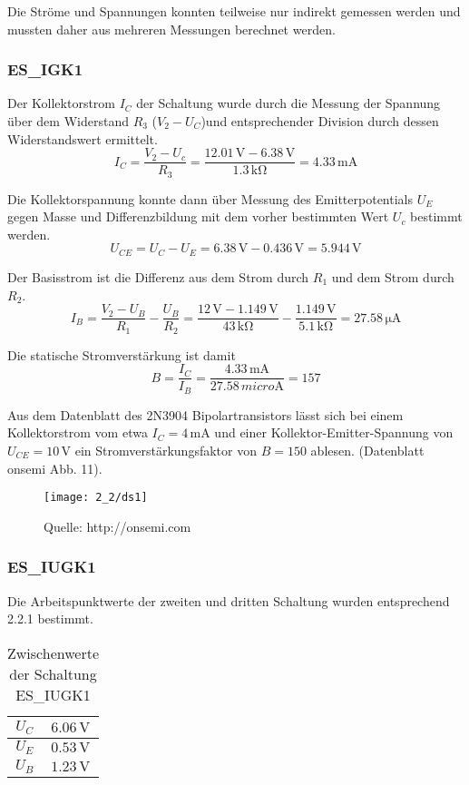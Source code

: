 Die Ströme und Spannungen konnten teilweise nur indirekt gemessen werden und
mussten daher aus mehreren Messungen berechnet werden.

\subsubsection{ES\_IGK1}
Der Kollektorstrom $I_C$ der Schaltung wurde durch die Messung der Spannung über dem
Widerstand $R_3$ ($V_2 - U_C$)und entsprechender Division durch dessen Widerstandswert
ermittelt.
\[I_C  = \frac{V_2 - U_c}{R_3} = \frac{12.01 \, \si{\volt} - 6.38 \,
    \si{\volt}}{1.3 \, \si{\kilo\ohm}} = 4.33 \, \si{\milli\ampere}\]

Die Kollektorspannung konnte dann über Messung des Emitterpotentials $U_E$ gegen Masse
und Differenzbildung mit dem vorher bestimmten Wert $U_c$ bestimmt werden.
\[U_{CE} = U_C - U_E = 6.38 \, \si{\volt} - 0.436 \, \si{\volt} = 5.944 \, \si{\volt}\]

Der Basisstrom ist die Differenz aus dem Strom durch $R_1$ und dem Strom durch
$R_2$.
\[I_B = \frac{V_2 - U_B}{R_1}-\frac{U_B}{R_2} = \frac{12 \, \si{\volt} - 1.149
    \, \si{\volt}}{43 \, \si{\kilo\ohm}} - \frac{1.149 \, \si{\volt}}{5.1 \,
    \si{\kilo\ohm}} = 27.58 \, \si{\micro\ampere}\]

Die statische Stromverstärkung ist damit
\[B = \frac{I_C}{I_B} = \frac{4.33 \, \si{\milli\ampere}}{27.58 \,
    \si{micro\ampere}} = 157\]

Aus dem Datenblatt des 2N3904 Bipolartransistors lässt sich bei einem
Kollektorstrom vom etwa $I_C = 4 \, \si{\milli\ampere}$ und einer
Kollektor-Emitter-Spannung von $U_{CE} = 10 \, \si{\volt}$ ein
Stromverstärkungsfaktor von $B = 150$ ablesen. (Datenblatt onsemi Abb. 11).

\begin{figure}[H]
  \begin{center}
    \texttt{[image: 2\_2/ds1]}
  \end{center}
  \caption{Quelle: http://onsemi.com}
\end{figure}

\subsubsection{ES\_IUGK1}
Die Arbeitspunktwerte der zweiten und dritten Schaltung wurden entsprechend 2.2.1 bestimmt.

\begin{table}[H]
\begin{center}
\begin{tabular}{c | c}
  $U_C$ & $6.06 \, \si{\volt}$\\
  \hline
  $U_E$ & $0.53 \, \si{\volt}$\\
  \hline
  $U_B$ & $1.23 \, \si{\volt}$\\
\end{tabular}
\end{center}
\caption{Zwischenwerte der Schaltung ES\_IUGK1}
\end{table}

